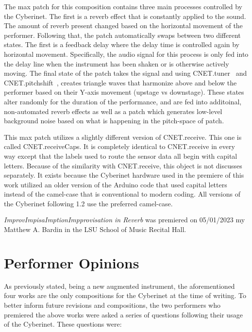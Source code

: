 The max patch for this composition contains three main processes controlled by the Cyberinet. The first is a reverb effect that is constantly applied to the sound. The amount of reverb present changed based on the horizontal movement of the performer. Following that, the patch automatically swaps between two different states. The first is a feedback delay where the delay time is controlled again by horizontal movement. Specifically, the audio signal for this process is only fed into the delay line when the instrument has been shaken or is otherwise actively moving. The final state of the patch takes the signal and using CNET.tuner~ and CNET.pitchshift~, creates triangle waves that harmonize above and below the performer based on their Y-axis movement (upstage vs downstage). These states alter randomly for the duration of the performance, and are fed into additoinal, non-automated reverb effects as well as a patch which generates low-level background noise based on what is happening in the pitch-space of patch.

This max patch utilizes a slightly different version of CNET.receive. This one is called CNET.receiveCaps. It is completely identical to CNET.receive in every way except that the labels used to route the sensor data all begin with capital letters. Because of the similarity with CNET.receive, this object is not discusses separately. It exists because the Cyberinet hardware used in the premiere of this work utilized an older version of the Arduino code that used capital letters instead of the camel-case that is conventional to modern coding. All versions of the Cyberinet following 1.2 use the preferred camel-case.

\textit{ImprovImpisaImptionImpprovisation in Reverb} was premiered on 05/01/2023 my Matthew A. Bardin in the LSU School of Music Recital Hall.

\section{Performer Opinions}
As previously stated, being a new augmented instrument, the aforementioned four works are the only compositions for the Cyberinet at the time of writing. To better inform future revisions and compositions, the two performers who premiered the above works were asked a series of questions following their usage of the Cyberinet. These questions were:


